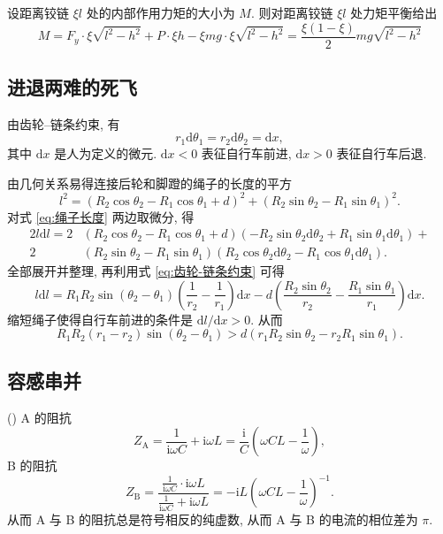 \documentclass{article}
\newcounter{para}
\newcommand\mypara{\par\refstepcounter{para}(\thepara)\space}
\begin{document}
设距离铰链 $\xi l$ 处的内部作用力矩的大小为 $M$.
则对距离铰链 $\xi l$ 处力矩平衡给出
\begin{equation}
	M=F_y\cdot\xi\sqrt{l^2-h^2}+P\cdot\xi h-\xi mg\cdot\xi\sqrt{l^2-h^2}
	=\frac{\xi\left(1-\xi\right)}2mg\sqrt{l^2-h^2}
\end{equation}

\subsection{进退两难的死飞}
由齿轮--链条约束, 有
\begin{equation}
	r_1\mathrm d\theta_1=r_2\mathrm d\theta_2=\mathrm dx,
	\label{eq:齿轮-链条约束}
\end{equation}
其中 $\mathrm dx$ 是人为定义的微元.
$\mathrm dx<0$ 表征自行车前进, $\mathrm dx>0$ 表征自行车后退.

由几何关系易得连接后轮和脚蹬的绳子的长度的平方
\begin{equation}
	l^2=\left(R_2\cos\theta_2-R_1\cos\theta_1+d\right)^2+\left(R_2\sin\theta_2-R_1\sin\theta_1\right)^2.
	\label{eq:绳子长度}
\end{equation}
对式 \ref{eq:绳子长度} 两边取微分, 得
\begin{equation}
\begin{split}
	2l\mathrm dl
	=2&\left(R_2\cos\theta_2-R_1\cos\theta_1+d\right)\left(-R_2\sin\theta_2\mathrm d\theta_2+R_1\sin\theta_1\mathrm d\theta_1\right)+\\
	2&\left(R_2\sin\theta_2-R_1\sin\theta_1\right)\left(R_2\cos\theta_2\mathrm d\theta_2-R_1\cos\theta_1\mathrm d\theta_1\right).
\end{split}
\end{equation}
全部展开并整理, 再利用式 \ref{eq:齿轮-链条约束} 可得
\begin{equation}
	l\mathrm dl=R_1R_2\sin\!\left(\theta_2-\theta_1\right)\left(\frac1{r_2}-\frac1{r_1}\right)\mathrm dx-d\left(\frac{R_2\sin\theta_2}{r_2}-\frac{R_1\sin\theta_1}{r_1}\right)\mathrm dx.
\end{equation}
缩短绳子使得自行车前进的条件是 $\mathrm dl/\mathrm dx>0$.
从而
\begin{equation}
	R_1R_2\left(r_1-r_2\right)\sin\!\left(\theta_2-\theta_1\right)>d\left(r_1R_2\sin\theta_2-r_2R_1\sin\theta_1\right).
\end{equation}

\subsection{容感串并}
\mypara
A 的阻抗
\begin{equation}
	Z_\mathrm A=\frac1{\mathrm i\omega C}+\mathrm i\omega L=\frac{\mathrm i}C\left(\omega CL-\frac1\omega\right),
	\label{eq:A的阻抗}
\end{equation}
B 的阻抗
\begin{equation}
	Z_\mathrm B=\frac{\frac1{\mathrm i\omega C}\cdot\mathrm i\omega L}{\frac1{\mathrm i\omega C}+\mathrm i\omega L}=-\mathrm iL\left(\omega CL-\frac1\omega\right)^{-1}.
	\label{eq:B的阻抗}
\end{equation}
从而 A 与 B 的阻抗总是符号相反的纯虚数, 从而 A 与 B 的电流的相位差为 $\pi$.
\end{document}
